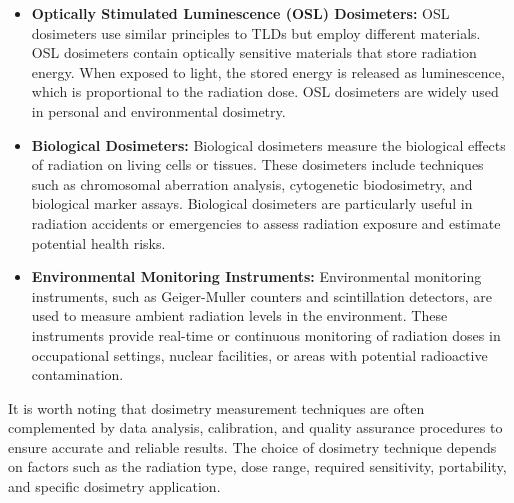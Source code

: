 \documentclass[../../Report.tex]{subfiles}
\begin{document}
\begin{itemize}
            \item \textbf{Optically Stimulated Luminescence (OSL) Dosimeters: } OSL dosimeters use similar principles to 
            TLDs but employ different materials. OSL dosimeters contain optically sensitive materials that store radiation 
            energy. When exposed to light, the stored energy is released as luminescence, which is proportional to the 
            radiation dose. OSL dosimeters are widely used in personal and environmental dosimetry.

            \item \textbf{Biological Dosimeters: } Biological dosimeters measure the biological effects of radiation on 
            living cells or tissues. These dosimeters include techniques such as chromosomal aberration analysis, 
            cytogenetic biodosimetry, and biological marker assays. Biological dosimeters are particularly useful in 
            radiation accidents or emergencies to assess radiation exposure and estimate potential health risks.

            \item \textbf{Environmental Monitoring Instruments: } Environmental monitoring instruments, such as 
            Geiger-Muller counters and scintillation detectors, are used to measure ambient radiation levels in the 
            environment. These instruments provide real-time or continuous monitoring of radiation doses in occupational 
            settings, nuclear facilities, or areas with potential radioactive contamination.

        \end{itemize}
        It is worth noting that dosimetry measurement techniques are often complemented by data analysis, calibration, 
        and quality assurance procedures to ensure accurate and reliable results. The choice of dosimetry technique depends 
        on factors such as the radiation type, dose range, required sensitivity, portability, and specific dosimetry 
        application.
\end{document}
